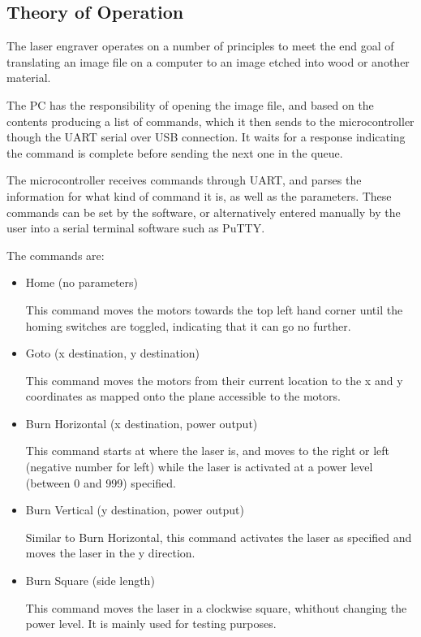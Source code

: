 \documentclass[11pt]{LaTeX-Classes/math-hw}
\begin{document}
\subsection{Theory of Operation}
The laser engraver operates on a number of principles to meet the end goal of
translating an image file on a computer to an image etched into wood or another material.

The PC has the responsibility of opening the image file, and based on the contents
producing a list of commands, which it then sends to the microcontroller though the
UART serial over USB connection. It waits for a response indicating the command is complete
before sending the next one in the queue.

The microcontroller receives commands through UART, and parses the information for
what kind of command it is, as well as the parameters.
These commands can be set by the software, or alternatively entered manually by the user
into a serial terminal software such as PuTTY.

The commands are:
\begin{itemize}
  \item Home (no parameters)

    This command moves the motors towards the top left hand corner until the homing switches
    are toggled, indicating that it can go no further.

  \item Goto (x destination, y destination)
    
    This command moves the motors from their current location to the x and y coordinates
    as mapped onto the plane accessible to the motors.

  \item Burn Horizontal (x destination, power output)

    This command starts at where the laser is, and moves to the right or left (negative number for left)
    while the laser is activated at a power level (between 0 and 999) specified.

  \item Burn Vertical (y destination, power output)
    
    Similar to Burn Horizontal, this command activates the laser as specified and moves the laser in the
    y direction.

  \item Burn Square (side length)

    This command moves the laser in a clockwise square, whithout changing the power level. It is
    mainly used for testing purposes.
\end{itemize}
\end{document}
